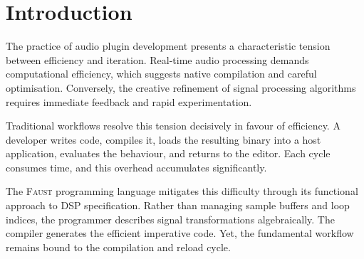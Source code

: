 \documentclass[twoside,a4paper]{article}
\title{\papertitle}
\newcommand{\F}{\textsc{Faust}}
\newcommand{\CLAP}{\textsc{Clap}}
\begin{document}

\maketitle

\begin{abstract}
We describe \texttt{faust2clap}, a framework establishing the first officially maintained compilation pathway from \F{} DSP specifications to the \CLAP{} format. The system operates in two modes: a static mode, wherein ahead-of-time compilation yields native binaries of optimal efficiency; and a dynamic mode, wherein runtime interpretation permits the modification of DSP code without interrupting the host application. This latter capability addresses a persistent friction in audio software development, namely the cumulative overhead of the edit, compile, and reload cycle.

We detail the algorithmic machinery underlying both modes, focusing specifically on the problem of parameter identity. To preserve both parameter values and their bindings to host automation across structural DSP mutations, we introduce an address-based semantic matching algorithm and a stable slot allocation scheme. The implementation, comprising approximately 2,400 lines of C++ architecture and Python tooling code, has been integrated into the main \F{} distribution.
\end{abstract}

\section{Introduction}
\label{sec:intro}

The practice of audio plugin development presents a characteristic tension between efficiency and iteration. Real-time audio processing demands computational efficiency, which suggests native compilation and careful optimisation. Conversely, the creative refinement of signal processing algorithms requires immediate feedback and rapid experimentation. 

Traditional workflows resolve this tension decisively in favour of efficiency. A developer writes code, compiles it, loads the resulting binary into a host application, evaluates the behaviour, and returns to the editor. Each cycle consumes time, and this overhead accumulates significantly. 

The \F{} programming language \cite{Orlarey2009} mitigates this difficulty through its functional approach to DSP specification. Rather than managing sample buffers and loop indices, the programmer describes signal transformations algebraically. The compiler generates the efficient imperative code. Yet, the fundamental workflow remains bound to the compilation and reload cycle.
\end{document}
